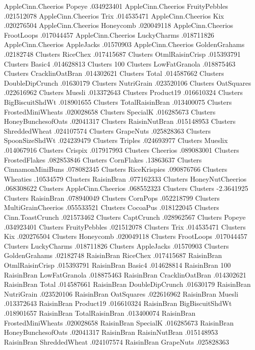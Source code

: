 AppleCinn.Cheerios	Popeye	.034923401
AppleCinn.Cheerios	FruityPebbles	.021512078
AppleCinn.Cheerios	Trix	.014535471
AppleCinn.Cheerios	Kix	.020276504
AppleCinn.Cheerios	Honeycomb	.020049118
AppleCinn.Cheerios	FrootLoops	.017044457
AppleCinn.Cheerios	LuckyCharms	.018711826
AppleCinn.Cheerios	AppleJacks	.01570903
AppleCinn.Cheerios	GoldenGrahams	.02182748
Clusters	RiceChex	.017415687
Clusters	OtmlRaisinCrisp	.015393791
Clusters	Basic4	.014628813
Clusters	100%
Clusters	LowFatGranola	.018875463
Clusters	CracklinOatBran	.014302621
Clusters	Total	.014587662
Clusters	DoubleDipCrunch	.01630179
Clusters	NutriGrain	.023520106
Clusters	OatSquares	.022616962
Clusters	Muesli	.013372643
Clusters	Product19	.016610324
Clusters	BigBiscuitShdWt	.018901655
Clusters	TotalRaisinBran	.013400075
Clusters	FrostedMiniWheats	.020028658
Clusters	SpecialK	.016285673
Clusters	HoneyBunchesofOats	.02041317
Clusters	RaisinNutBran	.015148953
Clusters	ShreddedWheat	.024107574
Clusters	GrapeNuts	.025828363
Clusters	SpoonSizeShdWt	.024239479
Clusters	Triples	.024693977
Clusters	Mueslix	.014067916
Clusters	Crispix	.017917993
Clusters	Cheerios	.089083001
Clusters	FrostedFlakes	.082853846
Clusters	CornFlakes	.13863637
Clusters	CinnamonMiniBuns	.078082345
Clusters	RiceKrispies	.090876766
Clusters	Wheaties	.10534579
Clusters	RaisinBran	.077162333
Clusters	HoneyNutCheerios	.068308622
Clusters	AppleCinn.Cheerios	.068552323
Clusters	Clusters	-2.3641925
Clusters	RaisinBran	.078940049
Clusters	CornPops	.052218799
Clusters	MultiGrainCheerios	.055533521
Clusters	CocoaPus	.018122045
Clusters	Cinn.ToastCrunch	.021573462
Clusters	CaptCrunch	.028962567
Clusters	Popeye	.034923401
Clusters	FruityPebbles	.021512078
Clusters	Trix	.014535471
Clusters	Kix	.020276504
Clusters	Honeycomb	.020049118
Clusters	FrootLoops	.017044457
Clusters	LuckyCharms	.018711826
Clusters	AppleJacks	.01570903
Clusters	GoldenGrahams	.02182748
RaisinBran	RiceChex	.017415687
RaisinBran	OtmlRaisinCrisp	.015393791
RaisinBran	Basic4	.014628814
RaisinBran	100%
RaisinBran	LowFatGranola	.018875463
RaisinBran	CracklinOatBran	.014302621
RaisinBran	Total	.014587661
RaisinBran	DoubleDipCrunch	.01630179
RaisinBran	NutriGrain	.023520106
RaisinBran	OatSquares	.022616962
RaisinBran	Muesli	.013372643
RaisinBran	Product19	.016610324
RaisinBran	BigBiscuitShdWt	.018901657
RaisinBran	TotalRaisinBran	.013400074
RaisinBran	FrostedMiniWheats	.020028658
RaisinBran	SpecialK	.016285673
RaisinBran	HoneyBunchesofOats	.02041317
RaisinBran	RaisinNutBran	.015148953
RaisinBran	ShreddedWheat	.024107574
RaisinBran	GrapeNuts	.025828363
